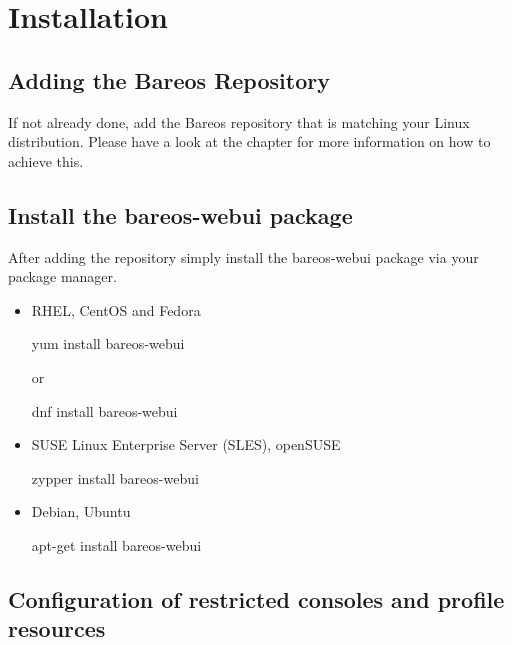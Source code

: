 \section{Installation}

\subsection{Adding the Bareos Repository}

If not already done, add the Bareos repository that is matching your Linux distribution. Please have a look at the chapter  for more information on how to achieve this.

\subsection{Install the bareos-webui package}

After adding the repository simply install the bareos-webui package via your package manager.

\begin{itemize}
 \item RHEL, CentOS and Fedora
\begin{commands}{}
yum install bareos-webui
\end{commands}
 or
\begin{commands}{}
dnf install bareos-webui
\end{commands}
\end{itemize}

\begin{itemize}
 \item SUSE Linux Enterprise Server (SLES), openSUSE
\begin{commands}{}
zypper install bareos-webui
\end{commands}
\end{itemize}

\begin{itemize}
 \item Debian, Ubuntu
\begin{commands}{}
apt-get install bareos-webui
\end{commands}
\end{itemize}


\subsection{Configuration of restricted consoles and profile resources}

